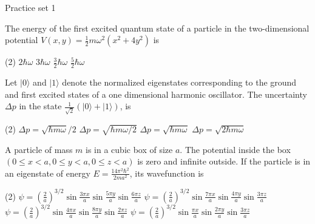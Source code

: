 \newpage
\begin{abox}
	Practice set 1
	\end{abox}
\begin{enumerate}
\begin{minipage}{\textwidth}
	\item The energy of the first excited quantum state of a particle in the two-dimensional potential $V(x, y)=\frac{1}{2} m \omega^{2}\left(x^{2}+4 y^{2}\right)$ is
\end{minipage}
\begin{tasks}(2)
	\task[\textbf{A.}] $2 \hbar \omega$
	\task[\textbf{B.}]$3 \hbar \omega$
	\task[\textbf{C.}]$\frac{3}{2} \hbar \omega$
	\task[\textbf{D.}] $\frac{5}{2} \hbar \omega$
\end{tasks}
\begin{minipage}{\textwidth}
	\item Let $|0\rangle$ and $|1\rangle$ denote the normalized eigenstates corresponding to the ground and first excited states of a one dimensional harmonic oscillator. The uncertainty $\Delta p$ in the state $\frac{1}{\sqrt{2}}(|0\rangle+|1\rangle)$, is
\end{minipage}
\begin{tasks}(2)
	\task[\textbf{A.}] $\Delta p=\sqrt{\hbar m \omega} / 2$
	\task[\textbf{B.}]$\Delta p=\sqrt{\hbar m \omega / 2}$
	\task[\textbf{C.}]$\Delta p=\sqrt{\hbar m \omega}$
	\task[\textbf{D.}]$\Delta p=\sqrt{2 \hbar m \omega}$
\end{tasks}
\begin{minipage}{\textwidth}
	\item A particle of mass $m$ is in a cubic box of size $a$. The potential inside the box $(0 \leq x<a, 0 \leq y<a, 0 \leq z<a)$ is zero and infinite outside. If the particle is in an eigenstate of energy $E=\frac{14 \pi^{2} \hbar^{2}}{2 m a^{2}}$, its wavefunction is
\end{minipage}
\begin{tasks}(2)
	\task[\textbf{A.}] $\psi=\left(\frac{2}{a}\right)^{3 / 2} \sin \frac{3 \pi x}{a} \sin \frac{5 \pi y}{a} \sin \frac{6 \pi z}{a}$
	\task[\textbf{B.}] $\psi=\left(\frac{2}{a}\right)^{3 / 2} \sin \frac{7 \pi x}{a} \sin \frac{4 \pi y}{a} \sin \frac{3 \pi z}{a}$
	\task[\textbf{C.}]$\psi=\left(\frac{2}{a}\right)^{3 / 2} \sin \frac{4 \pi x}{a} \sin \frac{8 \pi y}{a} \sin \frac{2 \pi z}{a}$
	\task[\textbf{D.}]$\psi=\left(\frac{2}{a}\right)^{3 / 2} \sin \frac{\pi x}{a} \sin \frac{2 \pi y}{a} \sin \frac{3 \pi z}{a}$

\end{tasks}
\end{enumerate}
